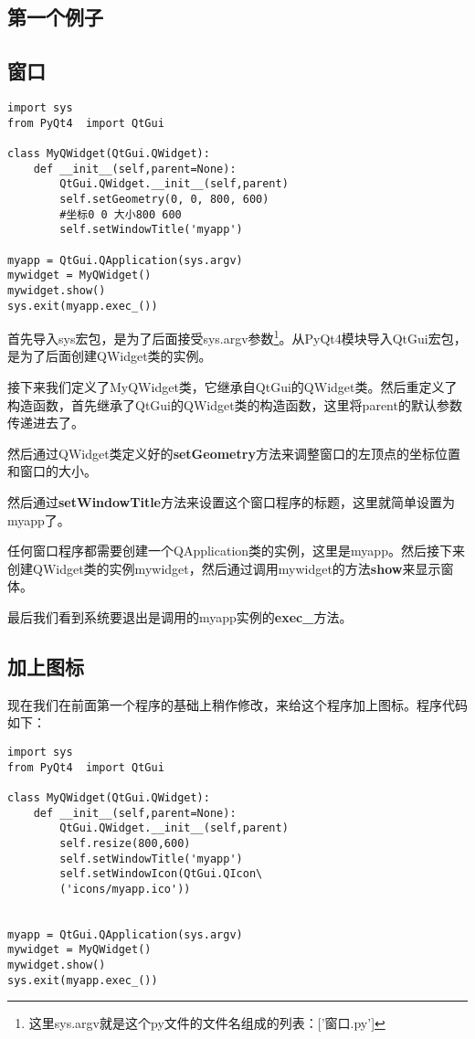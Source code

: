 \documentclass[12pt,oneside]{book}
\begin{document}
\begin{common-format}
\chapter{第一个例子}
\section{窗口}
\begin{Verbatim}
import sys
from PyQt4  import QtGui

class MyQWidget(QtGui.QWidget):
    def __init__(self,parent=None):
        QtGui.QWidget.__init__(self,parent)
        self.setGeometry(0, 0, 800, 600)
        #坐标0 0 大小800 600
        self.setWindowTitle('myapp')

myapp = QtGui.QApplication(sys.argv)
mywidget = MyQWidget()
mywidget.show()
sys.exit(myapp.exec_())
\end{Verbatim}

首先导入sys宏包，是为了后面接受sys.argv参数\footnote{这里sys.argv就是这个py文件的文件名组成的列表：['窗口.py']}。从PyQt4模块导入QtGui宏包，是为了后面创建QWidget类的实例。

接下来我们定义了MyQWidget类，它继承自QtGui的QWidget类。然后重定义了构造函数，首先继承了QtGui的QWidget类的构造函数，这里将parent的默认参数传递进去了。

然后通过QWidget类定义好的\textbf{setGeometry}方法来调整窗口的左顶点的坐标位置和窗口的大小。

然后通过\textbf{setWindowTitle}方法来设置这个窗口程序的标题，这里就简单设置为myapp了。

任何窗口程序都需要创建一个QApplication类的实例，这里是myapp。然后接下来创建QWidget类的实例mywidget，然后通过调用mywidget的方法\textbf{show}来显示窗体。

最后我们看到系统要退出是调用的myapp实例的\textbf{exec\_}方法。


\section{加上图标}
现在我们在前面第一个程序的基础上稍作修改，来给这个程序加上图标。程序代码如下：
\begin{Verbatim}
import sys
from PyQt4  import QtGui

class MyQWidget(QtGui.QWidget):
    def __init__(self,parent=None):
        QtGui.QWidget.__init__(self,parent)
        self.resize(800,600)
        self.setWindowTitle('myapp')
        self.setWindowIcon(QtGui.QIcon\
        ('icons/myapp.ico'))


myapp = QtGui.QApplication(sys.argv)
mywidget = MyQWidget()
mywidget.show()
sys.exit(myapp.exec_())
\end{Verbatim}


\end{common-format}
\end{document}
